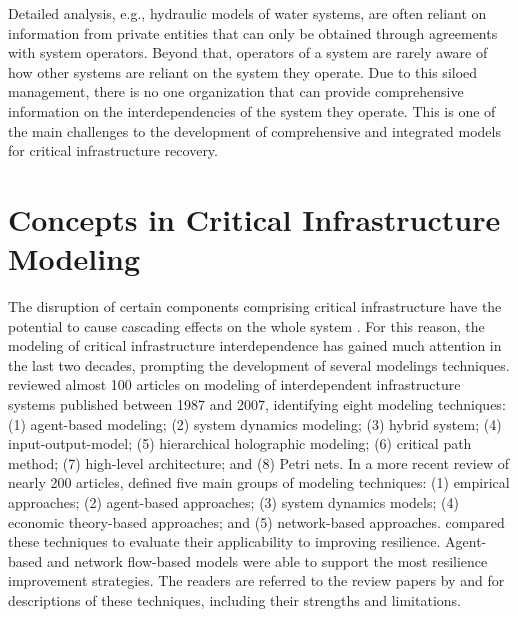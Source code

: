 Detailed analysis, e.g., hydraulic models of water systems, are often reliant on information from private entities that can only be obtained through agreements with system operators. Beyond that, operators of a system are rarely aware of how other systems are reliant on the system they operate. Due to this siloed management, there is no one organization that can provide comprehensive information on the interdependencies of the system they operate. This is one of the main challenges to the development of comprehensive and integrated models for critical infrastructure recovery.\ 

\section{Concepts in Critical Infrastructure Modeling}
The disruption of certain components comprising critical infrastructure have the potential to cause cascading effects on the whole system \citep{rinaldi2001identifying}. For this reason, the modeling of critical infrastructure interdependence has gained much attention in the last two decades, prompting the development of  several modelings techniques. \citet{Eusgeld2008a} reviewed almost 100 articles on modeling of interdependent infrastructure systems published between 1987 and 2007, identifying eight modeling techniques: (1) agent-based modeling; (2) system dynamics modeling; (3) hybrid system; (4) input-output-model; (5) hierarchical holographic modeling; (6) critical path method; (7) high-level architecture; and (8) Petri nets. In a more recent review of nearly 200 articles, \citet{ouyang2014review} defined five main groups of modeling techniques: (1) empirical approaches; (2) agent-based approaches; (3) system dynamics models; (4) economic theory-based approaches; and (5) network-based approaches. \citet{ouyang2014review} compared these techniques to evaluate their applicability to improving resilience. Agent-based and network flow-based models were able to support the most resilience improvement strategies. The readers are referred to the review papers by \citet{Eusgeld2008a} and \citet{ouyang2014review} for descriptions of these techniques, including their strengths and limitations. \ 

